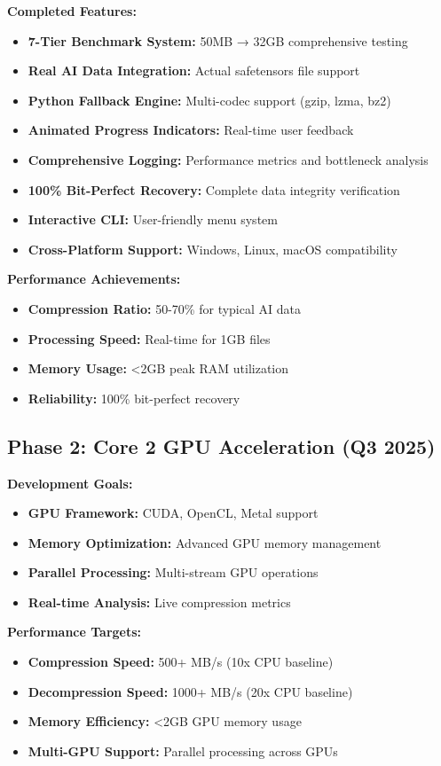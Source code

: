 \documentclass[12pt,a4paper]{article}
\begin{document}
\textbf{Completed Features:}
\begin{itemize}
    \item \textbf{7-Tier Benchmark System:} 50MB → 32GB comprehensive testing
    \item \textbf{Real AI Data Integration:} Actual safetensors file support
    \item \textbf{Python Fallback Engine:} Multi-codec support (gzip, lzma, bz2)
    \item \textbf{Animated Progress Indicators:} Real-time user feedback
    \item \textbf{Comprehensive Logging:} Performance metrics and bottleneck analysis
    \item \textbf{100\% Bit-Perfect Recovery:} Complete data integrity verification
    \item \textbf{Interactive CLI:} User-friendly menu system
    \item \textbf{Cross-Platform Support:} Windows, Linux, macOS compatibility
\end{itemize}

\textbf{Performance Achievements:}
\begin{itemize}
    \item \textbf{Compression Ratio:} 50-70\% for typical AI data
    \item \textbf{Processing Speed:} Real-time for 1GB files
    \item \textbf{Memory Usage:} <2GB peak RAM utilization
    \item \textbf{Reliability:} 100\% bit-perfect recovery
\end{itemize}

\subsection{Phase 2: Core 2 GPU Acceleration (Q3 2025)}

\textbf{Development Goals:}
\begin{itemize}
    \item \textbf{GPU Framework:} CUDA, OpenCL, Metal support
    \item \textbf{Memory Optimization:} Advanced GPU memory management
    \item \textbf{Parallel Processing:} Multi-stream GPU operations
    \item \textbf{Real-time Analysis:} Live compression metrics
\end{itemize}

\textbf{Performance Targets:}
\begin{itemize}
    \item \textbf{Compression Speed:} 500+ MB/s (10x CPU baseline)
    \item \textbf{Decompression Speed:} 1000+ MB/s (20x CPU baseline)
    \item \textbf{Memory Efficiency:} <2GB GPU memory usage
    \item \textbf{Multi-GPU Support:} Parallel processing across GPUs
\end{itemize}
\end{document}
